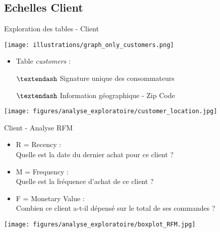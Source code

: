 \documentclass[10pt]{beamer}
\begin{document}
\subsection{Echelles Client}
\begin{frame}{Exploration des tables - Client }
\begin{center}
   \texttt{[image: illustrations/graph\_only\_customers.png]}
\end{center}
\begin{minipage}{0.33\linewidth}
    \begin{itemize}
        \item Table \textit{customers} :
    \end{itemize}
\end{minipage}
\begin{minipage}{0.65\linewidth}
    \begin{itemize}
        \item[$\textendash$] Signature unique des consommateurs
        \item[$\textendash$] Information géographique - Zip Code
    \end{itemize}
\end{minipage}
\begin{center}
   \texttt{[image: figures/analyse\_exploratoire/customer\_location.jpg]}
\end{center}
\end{frame}
\begin{frame}{Client - Analyse RFM }
\begin{itemize}
    \item R = Recency :\\
    {\footnotesize \hspace{0.5cm} Quelle est la date du dernier achat pour ce client ?}
    \item M = Frequency :\\
    {\footnotesize \hspace{0.5cm} Quelle est la fréquence d'achat de ce client ?}
    \item F = Monetary Value :\\
    {\footnotesize \hspace{0.5cm} Combien ce client a-t-il dépensé sur le total de ses commandes ?}
\end{itemize}
\begin{center}
   \texttt{[image: figures/analyse\_exploratoire/boxplot\_RFM.jpg]}
\end{center}
\end{frame}
\end{document}
